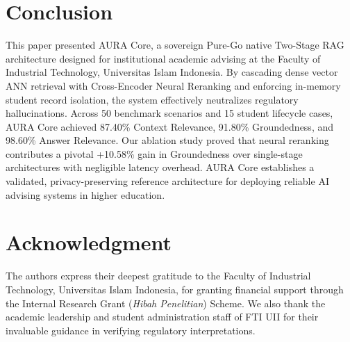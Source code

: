 \documentclass[conference]{IEEEtran}
\begin{document}
\section{Conclusion}
This paper presented AURA Core, a sovereign Pure-Go native Two-Stage RAG architecture designed for institutional academic advising at the Faculty of Industrial Technology, Universitas Islam Indonesia. By cascading dense vector ANN retrieval with Cross-Encoder Neural Reranking and enforcing in-memory student record isolation, the system effectively neutralizes regulatory hallucinations. Across 50 benchmark scenarios and 15 student lifecycle cases, AURA Core achieved 87.40\% Context Relevance, 91.80\% Groundedness, and 98.60\% Answer Relevance. Our ablation study proved that neural reranking contributes a pivotal +10.58\% gain in Groundedness over single-stage architectures with negligible latency overhead. AURA Core establishes a validated, privacy-preserving reference architecture for deploying reliable AI advising systems in higher education.

\section*{Acknowledgment}
The authors express their deepest gratitude to the Faculty of Industrial Technology, Universitas Islam Indonesia, for granting financial support through the Internal Research Grant (\textit{Hibah Penelitian}) Scheme. We also thank the academic leadership and student administration staff of FTI UII for their invaluable guidance in verifying regulatory interpretations.



\end{document}
